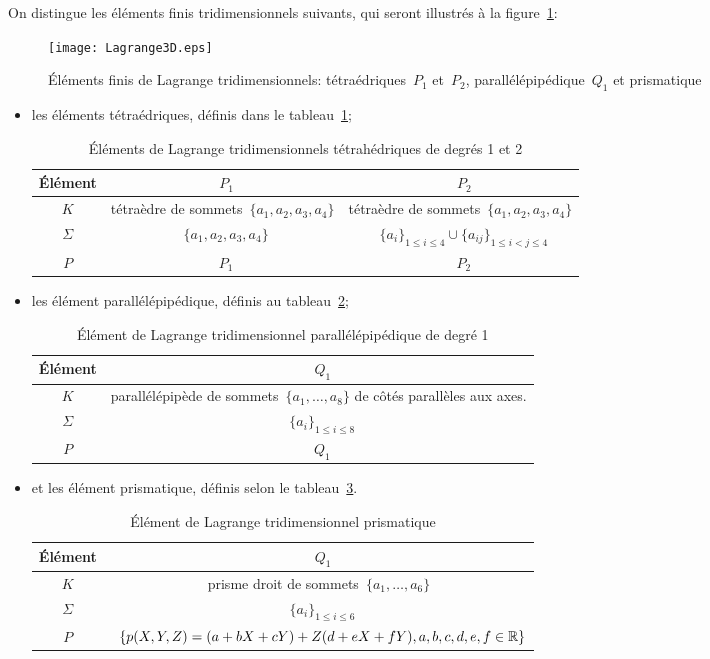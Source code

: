 On distingue les éléments finis tridimensionnels suivants, qui seront illustrés à la figure~\ref{Lagrange3D}:
\begin{figure}[ht]
\centering
\texttt{[image: Lagrange3D.eps]}
\caption{Éléments finis de Lagrange tridimensionnels: tétraédriques~$P_1$ et~$P_2$, parallélépipédique~$Q_1$ et prismatique}\label{Lagrange3D}
\end{figure}
\begin{itemize}
\item les éléments tétraédriques, définis dans le tableau~\ref{tab:Elem:tri};
\begin{table}[ht]\centering\small
\begin{tabular}{c|cc}
Élément &~$P_1$ &~$P_2$ \\
\hline
$K$	  & tétraèdre de sommets~$\{a_1, a_2, a_3, a_4\}$ & tétraèdre de sommets~$\{a_1, a_2, a_3, a_4\}$\\
$\Sigma$ &~$\{a_1, a_2, a_3, a_4\}$ &~$\{a_i\}_{1\le i\le4}\cup\{a_{ij}\}_{1\le i<j\le 4}$ \\
$P$   &~$P_1$ &~$P_2$ \\
\hline
\end{tabular}
\caption{Éléments de Lagrange tridimensionnels tétrahédriques de degrés 1 et 2}\label{tab:Elem:tri}
\end{table}
\item les élément parallélépipédique, définis au tableau~\ref{tab:Elem:para};
\begin{table}[ht]\centering\small
\begin{tabular}{c|c}
Élément &~$Q_1$\\
\hline
$K$ & parallélépipède de sommets~$\{a_1,\ldots, a_8\}$ de côtés parallèles aux axes.\\
$\Sigma$ &~$\{a_i\}_{1\le i\le8}$\\
$P$ &~$Q_1$\\
\hline
\end{tabular}
\caption{Élément de Lagrange tridimensionnel parallélépipédique de degré 1}\label{tab:Elem:para}
\end{table}
\item et les élément prismatique, définis selon le tableau~\ref{tab:Elem:pri}.
\begin{table}[ht]\centering\small
\begin{tabular}{c|c}
Élément &~$Q_1$\\
\hline
$K$ & prisme droit de sommets~$\{a_1,\ldots, a_6\}$\\
$\Sigma$ &~$\{a_i\}_{1\le i\le6}$\\
$P$ &~$\{p(X,Y,Z) = (a + bX + cY ) + Z(d + eX + fY ), a,b,c,d,e,f\in\mathbb R\}$\\
\hline
\end{tabular}
\caption{Élément de Lagrange tridimensionnel prismatique}\label{tab:Elem:pri}
\end{table}
\end{itemize}


